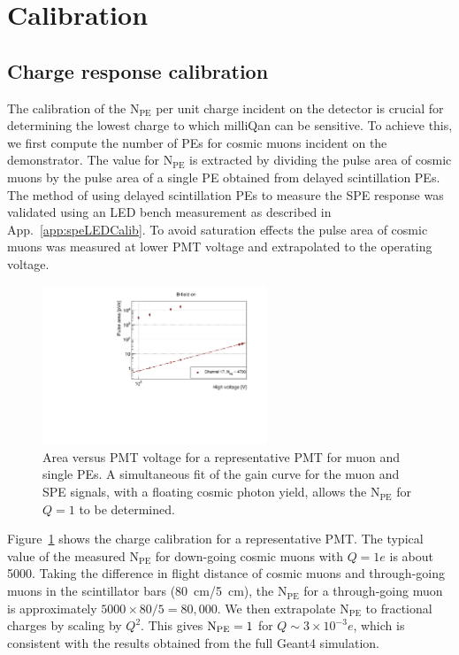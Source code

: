 \documentclass[12pt]{article}
\newcommand{\npe} {\mbox{\ensuremath{\textrm{N}_\textrm{PE}}}\xspace}
\begin{document}
\section{Calibration}

\subsection{Charge response calibration}
\label{sec:npeCalibration}
The calibration of the \npe per unit charge incident on the 
detector is crucial for determining the lowest charge to which milliQan can be sensitive. 
To achieve this, we first compute the number of PEs for cosmic muons 
incident on the demonstrator. The value for \npe is extracted by dividing the pulse area of cosmic 
muons by the pulse area of a single PE obtained from delayed scintillation PEs. The 
method of using delayed scintillation PEs to measure the SPE response was validated using 
an LED bench measurement as described in App.~\ref{app:speLEDCalib}. 
To avoid saturation effects the pulse area of cosmic muons 
was measured at lower PMT voltage and extrapolated to the operating voltage.

\begin{figure}
\centering
\includegraphics[width=0.6\textwidth]{figures/chargeCalibration.pdf}
\caption{Area versus PMT voltage for a representative PMT for muon and single PEs. A simultaneous fit of the gain curve for the muon and SPE signals, with a floating cosmic photon yield, allows the \npe for $Q=1$ to be determined.}
\label{fig:chargeCalib}
\end{figure}

Figure~\ref{fig:chargeCalib} shows the charge calibration for a representative PMT. The typical value of the 
measured \npe for down-going cosmic muons with $Q=1e$ is about 5000. Taking the difference 
in flight distance of cosmic muons and through-going muons in the scintillator bars (80~cm/5~cm), 
the \npe for a through-going muon is approximately $5000\times80/5 = 80,000$. We then extrapolate \npe 
to fractional charges by scaling by $Q^2$. This gives $\npe=1$ for $Q \sim 3\times10^{-3}e$, 
which is consistent with the results obtained from the full {\sc Geant4} simulation.
\end{document}
